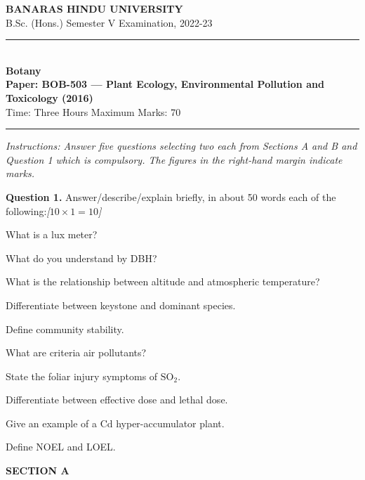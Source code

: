 \documentclass[11pt,a4paper]{article}
\newcommand{\pts}[1]{\hfill   \textit{[#1]}}
\begin{document}
\begin{center}
  {\large\bfseries BANARAS HINDU UNIVERSITY}\\[2pt]
  {\normalsize B.Sc. (Hons.) Semester V Examination, 2022-23}\\[6pt]
  \rule{0.8\linewidth}{0.5pt}\\[6pt]
  {\large\bfseries Botany}\\[4pt]
  {\large\bfseries Paper: BOB-503 --- Plant Ecology, Environmental Pollution and Toxicology (2016)}\\[4pt]
  {\normalsize Time: Three Hours \hfill Maximum Marks: 70}
\end{center}

\rule{\linewidth}{0.4pt}

\smallskip



\noindent   \textit{Instructions: Answer five questions selecting two each from Sections A and B and Question 1 which is compulsory. The figures in the right-hand margin indicate marks.}

\bigskip

\medskip


\noindent   \textbf{Question 1.} Answer/describe/explain briefly, in about 50 words each of the following:\pts{$10  \times 1 = 10$}

\begin{parts}
  \item What is a lux meter?
  \item What do you understand by DBH?
  \item What is the relationship between altitude and atmospheric temperature?
  \item Differentiate between keystone and dominant species.
  \item Define community stability.
  \item What are criteria air pollutants?
  \item State the foliar injury symptoms of $ \text{SO}_2$.
  \item Differentiate between effective dose and lethal dose.
  \item Give an example of a Cd hyper-accumulator plant.
  \item Define NOEL and LOEL.
\end{parts}

\bigskip

\begin{center}
   \textbf{SECTION A}
\end{center}
\medskip
\end{document}
